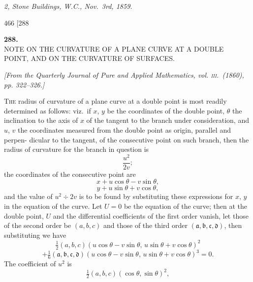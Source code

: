 \documentclass[11pt]{article}
\begin{document}
\smallskip

\hfill\textit{2, Stone Buildings, W.C., Nov.\ 3rd, 1859.}

\vfill

\newpage
\begin{center}
466 \hfill \textsc{[288}
\end{center}

\bigskip

\begin{center}
\textbf{\large 288.}\\[1ex]
\textsc{NOTE ON THE CURVATURE OF A PLANE CURVE AT A DOUBLE\\
POINT, AND ON THE CURVATURE OF SURFACES.}
\end{center}

\begin{center}
\textit{[From the Quarterly Journal of Pure and Applied Mathematics, vol. \textsc{iii}.\ (1860),
pp. 322--326.]}
\end{center}

\medskip

\textsc{The} radius of curvature of a plane curve at a double point is most readily
determined as follows: viz.\ if $x$, $y$ be the coordinates of the double point, $\theta$ the
inclination to the axis of $x$ of the tangent to the branch under consideration, and
$u$, $v$ the coordinates measured from the double point as origin, parallel and perpen-
dicular to the tangent, of the consecutive point on such branch, then the radius of
curvature for the branch in question is
\[ \frac{u^{2}}{2v}; \]
the coordinates of the consecutive point are
\[ x+u\cos\theta-v\sin\theta, \]
\[ y+u\sin\theta+v\cos\theta, \]
and the value of $u^{2}\div 2v$ is to be found by substituting these expressions for $x$, $y$ in
the equation of the curve. Let $U=0$ be the equation of the curve; then at the
double point, $U$ and the differential coefficients of the first order vanish, let those of
the second order be $(a,b,c)$ and those of the third order $(\mathfrak{a},\mathfrak{b},\mathfrak{c},\mathfrak{d})$, then substituting
we have
\[ \tfrac{1}{2}(a,b,c)(u\cos\theta-v\sin\theta,\, u\sin\theta+v\cos\theta)^{2} \]
\[ +\tfrac{1}{6}(\mathfrak{a},\mathfrak{b},\mathfrak{c},\mathfrak{d})(u\cos\theta-v\sin\theta,\, u\sin\theta+v\cos\theta)^{3}=0. \]
The coefficient of $u^{2}$ is
\[ \tfrac{1}{2}(a,b,c)(\cos\theta,\sin\theta)^{2}, \]
\end{document}
